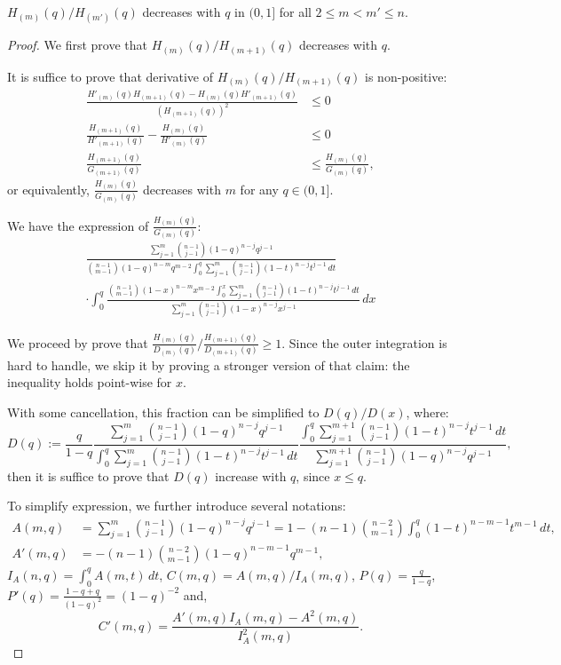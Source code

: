 \begin{lemma}\label{lem:FracDesc}
    $H_{(m)}(q)/H_{(m')}(q)$ decreases with $q$ in $(0,1]$ for all $2 \leq m < m' \leq n$.
\end{lemma}
\begin{proof}
    We first prove that $H_{(m)}(q)/H_{(m+1)}(q)$ decreases with $q$. 

    It is suffice to prove that derivative of $H_{(m)}(q)/H_{(m+1)}(q)$ is non-positive:
    \[
    \begin{aligned}
        \frac{H'_{(m)}(q)H_{(m+1)}(q)-H_{(m)}(q)H'_{(m+1)}(q)}{(H_{(m+1)}(q))^2} & \leq 0 \\
        \frac{H_{(m+1)}(q)}{H'_{(m+1)}(q)}-\frac{H_{(m)}(q)}{H'_{(m)}(q)} & \leq 0 \\
        \frac{H_{(m+1)}(q)}{G_{(m+1)}(q)} & \leq \frac{H_{(m)}(q)}{G_{(m)}(q)},
    \end{aligned}
    \]or equivalently, $\frac{H_{(m)}(q)}{G_{(m)}(q)}$ decreases with $m$ for any $q\in (0,1]$.

    We have the expression of $\frac{H_{(m)}(q)}{G_{(m)}(q)}$:
    \begin{multline*}
        \frac{\sum_{j=1}^m\binom{n-1}{j-1}(1-q)^{n-j}q^{j-1}}{\binom{n-1}{m-1}(1-q)^{n-m}q^{m-2}\int_0^q\sum_{j=1}^m\binom{n-1}{j-1}(1-t)^{n-j}t^{j-1}\, dt} \\ \cdot \int_0^q \frac{\binom{n-1}{m-1}(1-x)^{n-m}x^{m-2}\int_0^x\sum_{j=1}^m\binom{n-1}{j-1}(1-t)^{n-j}t^{j-1}\, dt}{\sum_{j=1}^m\binom{n-1}{j-1}(1-x)^{n-j}x^{j-1}}\, dx
    \end{multline*}

    We proceed by prove that $\frac{H_{(m)}(q)}{D_{(m)}(q)} / \frac{H_{(m+1)}(q)}{D_{(m+1)}(q)} \geq 1$. Since the outer integration is hard to handle, we skip it by proving a stronger version of that claim: the inequality holds point-wise for $x$. 

    With some cancellation, this fraction can be simplified to \(D(q)/D(x)\), where:
    \[
        D(q) := \frac{q}{1-q} \frac{\sum_{j=1}^m\binom{n-1}{j-1}(1-q)^{n-j}q^{j-1}}{\int_0^{q}\sum_{j=1}^{m}\binom{n-1}{j-1}(1-t)^{n-j}t^{j-1}\, dt} \frac{\int_0^{q}\sum_{j=1}^{m+1}\binom{n-1}{j-1}(1-t)^{n-j}t^{j-1}\, dt}{\sum_{j=1}^{m+1}\binom{n-1}{j-1}(1-q)^{n-j}q^{j-1}},
    \]
    then it is suffice to prove that $D(q)$ increase with $q$, since $x\leq q$. 

    To simplify expression, we further introduce several notations:
    \[
    \begin{aligned}
        A(m,q) & =\sum_{j=1}^m\binom{n-1}{j-1}(1-q)^{n-j}q^{j-1} = 1-(n-1)\binom{n-2}{m-1} \int_0^{q}(1-t)^{n-m-1}t^{m-1}\,dt, \\
        A'(m,q) & = -(n-1)\binom{n-2}{m-1}(1-q)^{n-m-1}q^{m-1},
    \end{aligned}
    \]$I_A(n,q)=  \int_0^qA(m,t) \, dt$, $C(m,q) = A(m,q)/I_A(m,q)$, $P(q) = \frac{q}{1-q}$, $P'(q)= \frac{1-q+q}{(1-q)^2} = (1-q)^{-2}$ and,
    \[
    C'(m,q) = \frac{A'(m,q)I_A(m,q)-A^2(m,q)}{I^2_A(m,q)}.
    \]


\end{proof}
